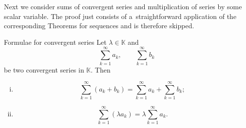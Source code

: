 

Next we consider sums of convergent series and multiplication of series by some scalar variable. The proof just consists of a~straightforward application of the corresponding Theorems for sequences and is therefore skipped.

\begin{Theorem}{Formulae for convergent series}\label{thm:serlimformnormed}
Let $\lambda\in\mathbb{K}$ and
\[\sum_{k=1}^\infty a_k,\qquad \sum_{k=1}^\infty b_k\]
be two convergent series in $\mathbb{K}$. Then
\begin{enumerate}[(i)]
 \item \[\sum_{k=1}^\infty(a_k+b_k)=\sum_{k=1}^\infty a_k+\sum_{k=1}^\infty b_k;\]
 \item \[\sum_{k=1}^\infty(\lambda a_k)=\lambda \sum_{k=1}^\infty a_k.\]
\end{enumerate}
\end{Theorem}

